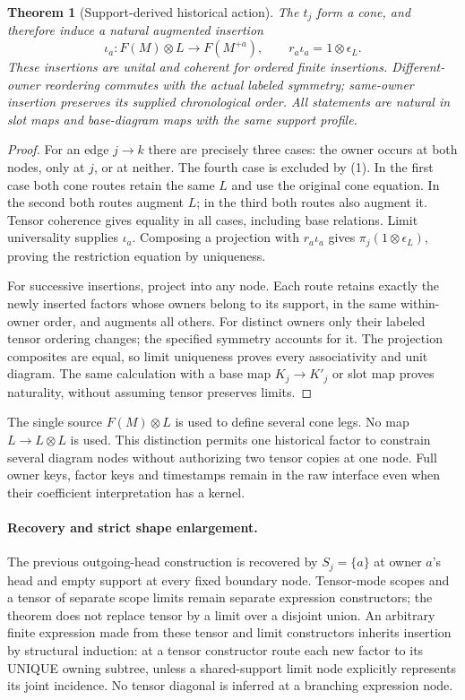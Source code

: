 \documentclass[11pt]{article}
\newtheorem{theorem}{Theorem}\newtheorem{proposition}{Proposition}\newtheorem{lemma}{Lemma}
\begin{document}
\begin{theorem}[Support-derived historical action]
The $t_j$ form a cone, and therefore induce a natural augmented insertion
\[
 \iota_a:F(M)\otimes L\longrightarrow F(M^{+a}),\qquad
 r_a\iota_a=1\otimes\epsilon_L.\tag{2}
\]
These insertions are unital and coherent for ordered finite insertions. Different-owner reordering commutes with the actual labeled symmetry; same-owner insertion preserves its supplied chronological order. All statements are natural in slot maps and base-diagram maps with the same support profile.
\end{theorem}
\begin{proof}
For an edge $j\to k$ there are precisely three cases: the owner occurs at both nodes, only at $j$, or at neither. The fourth case is excluded by (1). In the first case both cone routes retain the same $L$ and use the original cone equation. In the second both routes augment $L$; in the third both routes also augment it. Tensor coherence gives equality in all cases, including base relations. Limit universality supplies $\iota_a$. Composing a projection with $r_a\iota_a$ gives $\pi_j(1\otimes\epsilon_L)$, proving the restriction equation by uniqueness.

For successive insertions, project into any node. Each route retains exactly the newly inserted factors whose owners belong to its support, in the same within-owner order, and augments all others. For distinct owners only their labeled tensor ordering changes; the specified symmetry accounts for it. The projection composites are equal, so limit uniqueness proves every associativity and unit diagram. The same calculation with a base map $K_j\to K'_j$ or slot map proves naturality, without assuming tensor preserves limits.
\end{proof}

The single source $F(M)\otimes L$ is used to define several cone legs. No map $L\to L\otimes L$ is used. This distinction permits one historical factor to constrain several diagram nodes without authorizing two tensor copies at one node. Full owner keys, factor keys and timestamps remain in the raw interface even when their coefficient interpretation has a kernel.

\paragraph{Recovery and strict shape enlargement.}
The previous outgoing-head construction is recovered by $S_j=\{a\}$ at owner $a$'s head and empty support at every fixed boundary node. Tensor-mode scopes and a tensor of separate scope limits remain separate expression constructors; the theorem does not replace tensor by a limit over a disjoint union. An arbitrary finite expression made from these tensor and limit constructors inherits insertion by structural induction: at a tensor constructor route each new factor to its UNIQUE owning subtree, unless a shared-support limit node explicitly represents its joint incidence. No tensor diagonal is inferred at a branching expression node.
\end{document}
